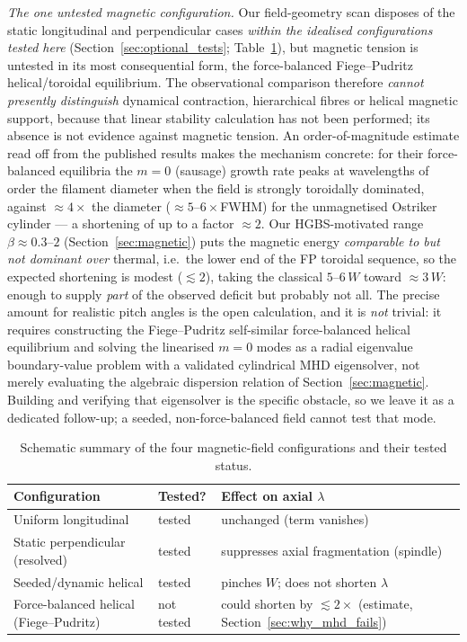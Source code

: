 \documentclass[usenatbib,twoside,twocolumn]{mnras}
\begin{document}
\emph{The one untested magnetic configuration.} Our field-geometry scan disposes of the static longitudinal and perpendicular cases \emph{within the idealised configurations tested here} (Section~\ref{sec:optional_tests}; Table~\ref{tab:magcases}), but magnetic tension is untested in its most consequential form, the force-balanced Fiege--Pudritz helical/toroidal equilibrium. The observational comparison therefore \emph{cannot presently distinguish} dynamical contraction, hierarchical fibres or helical magnetic support, because that linear stability calculation has not been performed; its absence is not evidence against magnetic tension. An order-of-magnitude estimate read off from the published \citet{Fiege2000} results makes the mechanism concrete: for their force-balanced equilibria the $m=0$ (sausage) growth rate peaks at wavelengths of order the filament diameter when the field is strongly toroidally dominated, against $\approx4\times$ the diameter ($\approx5$--$6\times$FWHM) for the unmagnetised Ostriker cylinder --- a shortening of up to a factor $\approx2$. Our HGBS-motivated range $\beta\approx0.3$--$2$ (Section~\ref{sec:magnetic}) puts the magnetic energy \emph{comparable to but not dominant over} thermal, i.e.\ the lower end of the FP toroidal sequence, so the expected shortening is modest ($\lesssim2$), taking the classical $5$--$6\,W$ toward $\approx3\,W$: enough to supply \emph{part} of the observed deficit but probably not all. The precise amount for realistic pitch angles is the open calculation, and it is \emph{not} trivial: it requires constructing the Fiege--Pudritz self-similar force-balanced helical equilibrium and solving the linearised $m=0$ modes as a radial eigenvalue boundary-value problem with a validated cylindrical MHD eigensolver, not merely evaluating the algebraic dispersion relation of Section~\ref{sec:magnetic}. Building and verifying that eigensolver is the specific obstacle, so we leave it as a dedicated follow-up; a seeded, non-force-balanced field cannot test that mode.

\begin{table}
\caption{Schematic summary of the four magnetic-field configurations and their tested status.}
\label{tab:magcases}
\footnotesize
\setlength{\tabcolsep}{4pt}
\begin{tabular}{@{}p{2.9cm}lp{3.0cm}@{}}
\toprule
Configuration & Tested? & Effect on axial $\lambda$ \\
\midrule
Uniform longitudinal & tested & unchanged (term vanishes) \\
Static perpendicular (resolved) & tested & suppresses axial fragmentation (spindle) \\
Seeded/dynamic helical & tested & pinches $W$; does not shorten $\lambda$ \\
Force-balanced helical (Fiege--Pudritz) & not tested & could shorten by $\lesssim2\times$ (estimate, Section~\ref{sec:why_mhd_fails}) \\
\bottomrule
\end{tabular}
\end{table}
\end{document}
